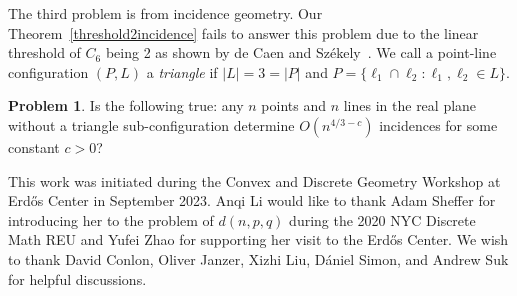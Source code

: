 \documentclass[11pt]{article}
\theoremstyle{definition}
\newtheorem{problem}[theorem]{Problem}
\begin{document}
The third problem is from incidence geometry. Our Theorem~\ref{threshold2incidence} fails to answer this problem due to the linear threshold of $C_6$ being 2 as shown by de Caen and Sz\'ekely~\cite{de1991maximum}. We call a point-line configuration $(P, L)$ a \textit{triangle} if $|L|=3=|P|$ and $P = \{\ell_1 \cap \ell_2 : \ell_1, \ell_2 \in L\}$.
\begin{problem}
    Is the following true: any $n$ points and $n$ lines in the real plane without a triangle sub-configuration determine $O(n^{4/3 - c})$ incidences for some constant $c > 0$?
\end{problem}

 This work was initiated during the Convex and Discrete Geometry Workshop at Erd\H{o}s Center in September 2023. Anqi Li would like to thank Adam Sheffer for introducing her to the problem of $d(n,p,q)$ during the 2020 NYC Discrete Math REU and Yufei Zhao for supporting her visit to the Erd\H{o}s Center. We wish to thank David Conlon, Oliver Janzer, Xizhi Liu, Dániel Simon, and Andrew Suk for helpful discussions.


{\footnotesize}
\end{document}
